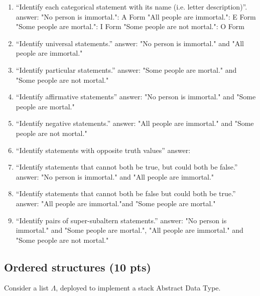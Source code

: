 \documentclass[12pt]{article}
\begin{document}
\begin{enumerate}
\item  ``Identify each categorical statement with its name (i.e. letter description)''.
\subitem answer:
\subitem "No person is immortal.": A Form
\subitem "All people are immortal.": E Form
\subitem "Some people are mortal.": I Form
\subitem "Some people are not mortal.": O Form 

\item ``Identify universal statements.''
\subitem answer: 
\subitem "No person is immortal." and "All people are immortal."

\item ``Identify particular statements.''
\subitem answer:
\subitem "Some people are mortal." and "Some people are not mortal."

\item ``Identify affirmative statements''
\subitem answer:
\subitem "No person is immortal." and "Some people are mortal."

\item ``Identify negative statements.''
\subitem answer: 
\subitem "All people are immortal." and "Some people are not mortal."

\item ``Identify statements with opposite truth values''
\subitem answer:  

\item ``Identify statements that cannot both be true, but could both be false.''
\subitem answer:  
\subitem "No person is immortal." and "All people are immortal."

\item ``Identify statements that cannot both be false but could both be true.''
\subitem answer:  
\subitem "All people are immortal."and "Some people are mortal."

\item ``Identify pairs of super-subaltern statements.''
\subitem answer: 
\subitem "No person is immortal." and "Some people are mortal.",  
\subitem "All people are immortal." and "Some people are not mortal."

\end{enumerate}


\newpage

\subsection{Ordered structures (10 pts)}

Consider a list $\Lambda$, deployed to implement a stack Abstract Data Type.
\end{document}
